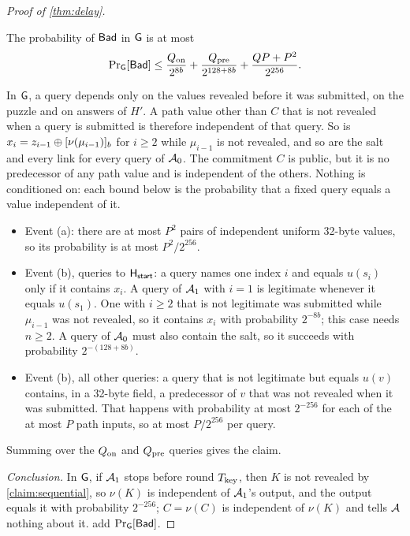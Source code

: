 \begin{proof}[Proof of \cref{thm:delay}]
\begin{claim}\label{claim:bad}
The probability of\/ $\mathsf{Bad}$ in\/ $\mathsf{G}$ is at most
\[
  \Pr\nolimits_{\mathsf{G}}[\mathsf{Bad}] \le \frac{Q_{\mathrm{on}}}{2^{8b}} + \frac{Q_{\mathrm{pre}}}{2^{128 + 8b}} + \frac{QP + P^2}{2^{256}}.
\]
\end{claim}
\begin{claimproof}
In $\mathsf{G}$, a query depends only on the values revealed before it was submitted, on the puzzle and on answers of $H'$. A path value other than $C$ that is not revealed when a query is submitted is therefore independent of that query. So is $x_i = z_{i-1} \oplus [\nu(\mu_{i-1})]_{b}$ for $i \ge 2$ while $\mu_{i-1}$ is not revealed, and so are the salt and every link for every query of $\mathcal{A}_0$. The commitment $C$ is public, but it is no predecessor of any path value and is independent of the others. Nothing is conditioned on: each bound below is the probability that a fixed query equals a value independent of it.
\begin{itemize}[leftmargin=1.5em]
  \item Event (a): there are at most $P^2$ pairs of independent uniform 32-byte values, so its probability is at most $P^2 / 2^{256}$.
  \item Event (b), queries to $\mathsf{H}_{\mathsf{start}}$: a query names one index $i$ and equals $u(s_i)$ only if it contains $x_i$. A query of $\mathcal{A}_1$ with $i = 1$ is legitimate whenever it equals $u(s_1)$. One with $i \ge 2$ that is not legitimate was submitted while $\mu_{i-1}$ was not revealed, so it contains $x_i$ with probability $2^{-8b}$; this case needs $n \ge 2$. A query of $\mathcal{A}_0$ must also contain the salt, so it succeeds with probability $2^{-(128 + 8b)}$.
  \item Event (b), all other queries: a query that is not legitimate but equals $u(v)$ contains, in a 32-byte field, a predecessor of $v$ that was not revealed when it was submitted. That happens with probability at most $2^{-256}$ for each of the at most $P$ path inputs, so at most $P / 2^{256}$ per query.
\end{itemize}
Summing over the $Q_{\mathrm{on}}$ and $Q_{\mathrm{pre}}$ queries gives the claim.
\end{claimproof}

\emph{Conclusion.}
In $\mathsf{G}$, if $\mathcal{A}_1$ stops before round $T_{\mathrm{key}}$, then $K$ is not revealed by \cref{claim:sequential}, so $\nu(K)$ is independent of $\mathcal{A}_1$'s output, and the output equals it with probability $2^{-256}$; $C = \nu(C)$ is independent of $\nu(K)$ and tells $\mathcal{A}$ nothing about it.  add $\Pr_{\mathsf{G}}[\mathsf{Bad}]$.
\end{proof}

